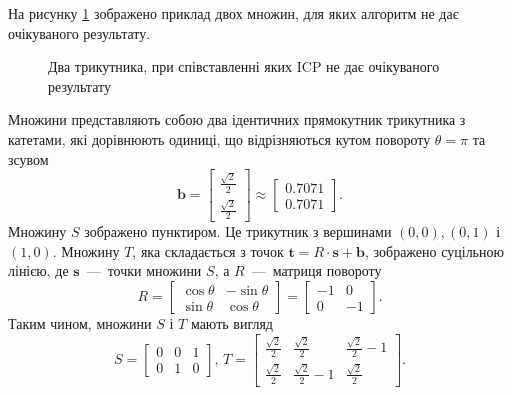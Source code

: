 На рисунку \ref{fig:triangles} зображено приклад двох множин,
для яких алгоритм не дає очікуваного результату.

\begin{figure}[h]
  \centering
  
  \caption{Два трикутника, при співставленні яких ICP не дає очікуваного результату}
  \label{fig:triangles}
\end{figure}

Множини представляють собою два ідентичних прямокутник трикутника з катетами,
які дорівнюють одиниці, що відрізняються кутом повороту $\theta = \pi$ та зсувом
\begin{equation*}
  \boldsymbol{b} =
  \begin{bmatrix}
    \frac{ \sqrt{2}}{2} \\
    \frac{ \sqrt{2}}{2}
  \end{bmatrix} \approx
  \begin{bmatrix}
    0.7071 \\
    0.7071
  \end{bmatrix}.
\end{equation*}
Множину $S$ зображено пунктиром.
Це трикутник з вершинами
$ \left( 0, 0 \right), \left( 0, 1 \right) $ і $ \left( 1, 0 \right) $.
Множину $T$, яка складається з точок $\boldsymbol{t} = R \cdot \boldsymbol{s} + \boldsymbol{b}$,
зображено суцільною лінією, де $\boldsymbol{s}$~---~точки множини $S$,
а $R$~---~матриця повороту
\begin{equation*}
  R =
  \begin{bmatrix}
    \cos \theta & -\sin \theta \\
    \sin \theta & \cos \theta
  \end{bmatrix} =
  \begin{bmatrix}
    -1 & 0 \\
    0 & -1
  \end{bmatrix}.
\end{equation*}
Таким чином, множини $S$ і $T$ мають вигляд
\begin{equation*}
  S =
  \begin{bmatrix}
    0 & 0 & 1 \\
    0 & 1 & 0
  \end{bmatrix}, \,
  T =
  \begin{bmatrix}
    \frac{ \sqrt{2}}{2} & \frac{ \sqrt{2}}{2} & \frac{ \sqrt{2}}{2} - 1 \\
    \frac{ \sqrt{2}}{2} & \frac{ \sqrt{2}}{2} - 1 & \frac{ \sqrt{2}}{2}
  \end{bmatrix}.
\end{equation*}

